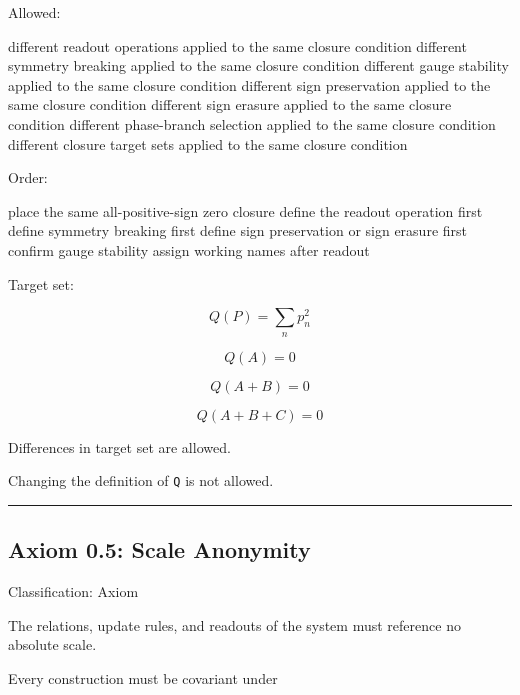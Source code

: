 \documentclass[
  a4paper,
]{article}
\newenvironment{Shaded}{}{}
\newcommand{\NormalTok}[1]{#1}
\begin{document}
Allowed:

\begin{Shaded}
\begin{Highlighting}[]
\NormalTok{different readout operations applied to the same closure condition}
\NormalTok{different symmetry breaking applied to the same closure condition}
\NormalTok{different gauge stability applied to the same closure condition}
\NormalTok{different sign preservation applied to the same closure condition}
\NormalTok{different sign erasure applied to the same closure condition}
\NormalTok{different phase{-}branch selection applied to the same closure condition}
\NormalTok{different closure target sets applied to the same closure condition}
\end{Highlighting}
\end{Shaded}

Order:

\begin{Shaded}
\begin{Highlighting}[]
\NormalTok{place the same all{-}positive{-}sign zero closure}
\NormalTok{define the readout operation first}
\NormalTok{define symmetry breaking first}
\NormalTok{define sign preservation or sign erasure first}
\NormalTok{confirm gauge stability}
\NormalTok{assign working names after readout}
\end{Highlighting}
\end{Shaded}

Target set:

\[
Q(P)=\sum_n p_n^2
\]

\[
Q(A)=0
\]

\[
Q(A+B)=0
\]

\[
Q(A+B+C)=0
\]

Differences in target set are allowed.

Changing the definition of \texttt{Q} is not allowed.

\begin{center}\rule{0.5\linewidth}{0.5pt}\end{center}

\subsection{Axiom 0.5: Scale Anonymity}\label{axiom-0.5-scale-anonymity}

Classification: Axiom

The relations, update rules, and readouts of the system must reference
no absolute scale.

Every construction must be covariant under
\end{document}
